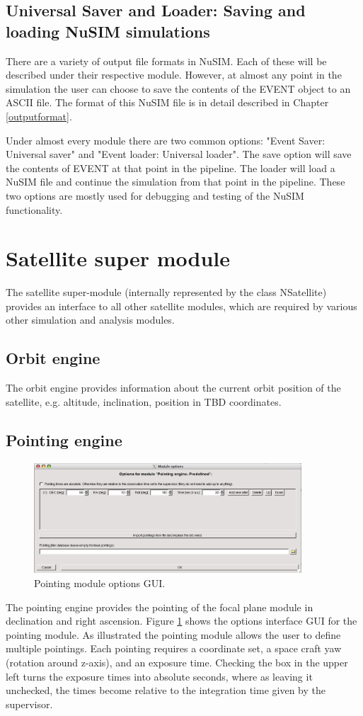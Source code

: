 \subsection{Universal Saver and Loader: Saving and loading NuSIM simulations}
There are a variety of output file formats in NuSIM. Each of these will be described under their respective module. However, at almost any point in the simulation the user can choose to save the contents of the EVENT object to an ASCII file. The format of this NuSIM file is in detail described in Chapter \ref{outputformat}. 

Under almost every module there are two common options: "Event Saver: Universal saver" and "Event loader: Universal loader". The save option will save the contents of EVENT at that point in the pipeline. The loader will load a NuSIM file and continue the simulation from that point in the pipeline. These two options are mostly used for debugging and testing of the NuSIM functionality.

\section{Satellite super module}\label{ssm}
The satellite super-module (internally represented by the class NSatellite) provides an interface to all other satellite modules, which are required by various other simulation and analysis modules.
\subsection{Orbit engine}
The orbit engine provides information about the current orbit position of the satellite, e.g. altitude, inclination, position in TBD coordinates.

\subsection{Pointing engine}
\begin{figure}[bt]
\begin{center}
\includegraphics[width=10cm]{images/pointingGUI.png}  
\caption{Pointing module options GUI.}
\label{pointinggui} 
\end{center}
\end{figure}
The pointing engine provides the pointing of the focal plane module in declination and right ascension. Figure \ref{pointinggui} shows the options interface GUI for the pointing module. As illustrated the pointing module allows the user to define multiple pointings. Each pointing requires a coordinate set, a space craft yaw (rotation around z-axis), and an exposure time. Checking the box in the upper left turns the exposure times into absolute seconds, where as leaving it unchecked, the times become relative to the integration time given by the supervisor.

